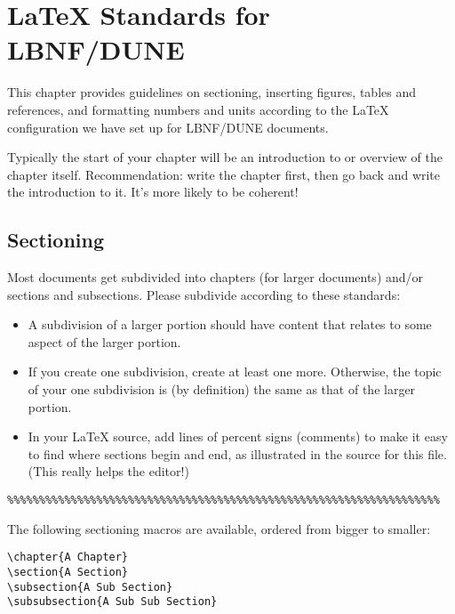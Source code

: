 
\chapter{\LaTeX{} Standards for LBNF/DUNE }
\label{ch:latex-stds}

This chapter provides guidelines on sectioning,  inserting figures, tables and references, and formatting numbers and units according to the \LaTeX{} configuration we have set up for LBNF/DUNE documents.

Typically the start of your chapter will be an introduction to or overview of the chapter itself. Recommendation: write the chapter first, then go back and write the introduction to it. It's more likely to be coherent!

\section{Sectioning}
\label{sec:sectioning}

Most documents get subdivided into chapters (for larger documents) and/or sections and subsections. Please subdivide according to these standards:

\begin{itemize}
\item A subdivision of a larger portion should have content that relates to some aspect of the larger portion. 
\item  If you create one subdivision, create at least one more. Otherwise, the topic of your one subdivision is (by definition) the same as that of the larger portion.
\item In your \LaTeX{} source, add lines of percent signs (comments) to make it easy to find where sections begin and end, as illustrated in the source for this file. (This really helps the editor!)
\end{itemize}

\begin{verbatim}
%%%%%%%%%%%%%%%%%%%%%%%%%%%%%%%%%%%%%%%%%%%%%%%%%%%%%%%%%%%%%%%%%%%%
\end{verbatim}

The following sectioning macros are available, ordered from bigger to smaller:

\begin{verbatim}
\chapter{A Chapter}
\section{A Section}
\subsection{A Sub Section}
\subsubsection{A Sub Sub Section}
\end{verbatim}

